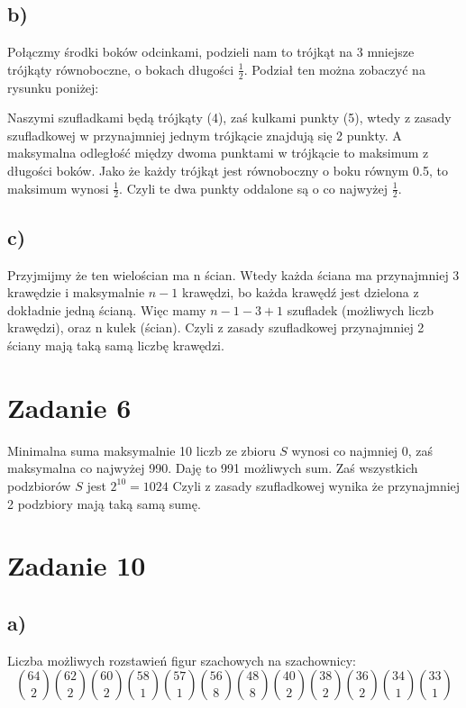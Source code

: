 \documentclass{article}
\begin{document}
\subsection*{b) }
Połączmy środki boków odcinkami, podzieli nam to trójkąt na 3 mniejsze trójkąty równoboczne, o bokach długości $\frac{1}{2}$. Podział ten można zobaczyć na rysunku poniżej:
\begin{center}
\end{center}
Naszymi szufladkami będą trójkąty (4), zaś kulkami punkty (5), wtedy z zasady szufladkowej w przynajmniej jednym trójkącie znajdują się 2 punkty. A maksymalna odległość między dwoma punktami w trójkącie to maksimum z długości boków. Jako że każdy trójkąt jest równoboczny o boku równym 0.5, to maksimum wynosi $\frac{1}{2}$. Czyli  te dwa punkty oddalone są o co najwyżej $\frac{1}{2}$.
\subsection*{c)}
Przyjmijmy że ten wielościan ma n ścian. Wtedy każda ściana ma przynajmniej 3 krawędzie i maksymalnie $n-1$ krawędzi, bo każda krawędź jest dzielona z dokładnie jedną ścianą. Więc mamy $n-1-3+1$ szufladek (możliwych liczb krawędzi), oraz n kulek (ścian). Czyli z zasady szufladkowej przynajmniej 2 ściany mają taką samą liczbę krawędzi.

\section*{Zadanie 6}
Minimalna suma maksymalnie 10 liczb ze zbioru $S$ wynosi co najmniej 0, zaś maksymalna co najwyżej 990. Daję to 991
możliwych sum. Zaś wszystkich podzbiorów $S$ jest $2^{10} = 1024$ Czyli z zasady szufladkowej wynika że przynajmniej 2 podzbiory mają taką samą sumę. 

\section*{Zadanie 10}
\subsection*{a)}
Liczba możliwych rozstawień figur szachowych na szachownicy:
\[ {64 \choose 2} {62 \choose 2} {60 \choose 2} {58 \choose 1} {57 \choose 1} {56 \choose 8} {48 \choose 8} {40 \choose 2} {38 \choose 2} {36 \choose 2} {34 \choose 1} {33 \choose 1}\]
\end{document}
